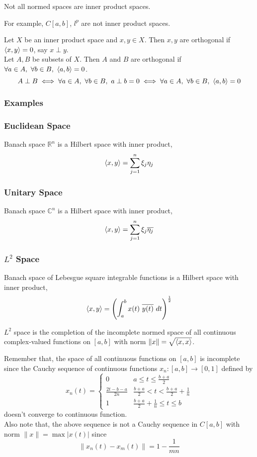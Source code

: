 \begin{important}
	Not all normed spaces are inner product spaces.
\end{important}

	For example, $C[a,b]$, $l^p$ are not inner product spaces.

\begin{definition}[orthogonality]
	Let $X$ be an inner product space and  $x,y \in X$.
	Then $x,y$ are orthogonal if $\left\langle x,y \right\rangle = 0$, say $x \perp y$.\\

	Let $A,B$ be subsets of $X$.
	Then $A$ and $B$ are orthogonal if $\forall a \in A,\ \forall b \in B,\ \left\langle a,b \right\rangle = 0$.
	\[ A \perp B \iff \forall a \in A,\ \forall b \in B,\ a \perp b = 0 \iff \forall a \in A,\ \forall b \in B,\  \left\langle a,b \right\rangle = 0 \]
\end{definition}
\subsubsection{Examples}
\subsubsection{Euclidean Space}
	Banach space $\mathbb{R}^n$ is a Hilbert space with inner product,
	\[ \left\langle x,y \right\rangle = \sum_{j=1}^n \xi_j \eta_j \]
\subsubsection{Unitary Space}
	Banach space $\mathbb{C}^n$ is a Hilbert space with inner product,
	\[ \left\langle x,y \right\rangle = \sum_{j=1}^n \xi_j \overline{\eta_j} \]
\subsubsection{$L^2$ Space}
	Banach space of Lebesgue square integrable functions is a Hilbert space with inner product,
	\[ \left\langle x,y \right\rangle = \left(\int_a^b x(t) \ \overline{y(t)} \ dt \right)^\frac{1}{2} \]

	$L^2$ space is the completion of the incomplete normed space of all continuous complex-valued functions on $[a,b]$ with norm $\|x\| = \sqrt{\left\langle x,x \right\rangle}$.\\

	\begin{commentary}
		Remember that, the space of all continuous functions on $[a,b]$ is incomplete since the Cauchy sequence of continuous functions $x_n : [a,b] \to [0,1]$ defined by
	\[ x_n(t) = \begin{cases} 0 & a \le t \le \frac{b+a}{2} \\ \frac{2t-b-a}{2n} & \frac{b+a}{2} < t < \frac{b+a}{2} + \frac{1}{n} \\ 1 & \frac{b+a}{2}+\frac{1}{n} \le t \le b \end{cases} \]
		doesn't converge to continuous function.\\

		Also note that, the above sequence is not a Cauchy sequence in $C[a,b]$ with norm $\|x\| = \max |x(t)|$ since 
		\[ \|x_n(t)-x_m(t)\| = 1-\frac{1}{mn} \]
	\end{commentary}
